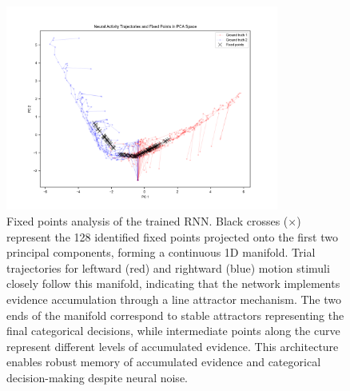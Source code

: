 \documentclass[11pt]{article}
\begin{document}
\begin{figure}[h]
\centering
\includegraphics[width=0.8\textwidth]{pca_fixedpoints.png}
\caption{Fixed points analysis of the trained RNN. Black crosses (×) represent the 128 identified fixed points projected onto the first two principal components, forming a continuous 1D manifold. Trial trajectories for leftward (red) and rightward (blue) motion stimuli closely follow this manifold, indicating that the network implements evidence accumulation through a line attractor mechanism. The two ends of the manifold correspond to stable attractors representing the final categorical decisions, while intermediate points along the curve represent different levels of accumulated evidence. This architecture enables robust memory of accumulated evidence and categorical decision-making despite neural noise.}
\label{fig:fixed_point_manifold}
\end{figure}
\end{document}
